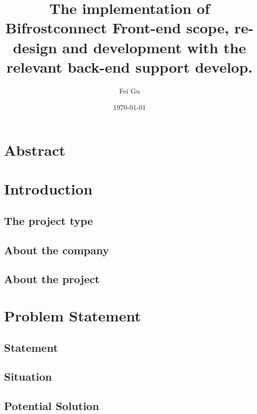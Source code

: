 \documentclass{article}
\title{The implementation of Bifrostconnect Front-end scope, re-design and
development with the relevant back-end support develop.}
\author{Fei Gu}
\date{\today}
\begin{document}
\maketitle
\section*{Abstract}
\pagebreak

\tableofcontents
\pagebreak

\section{Introduction}

    \subsection{The project type}
    

    \subsection{About the company}
    

    \subsection{About the project}
    

\pagebreak

\section{Problem Statement}
    
        \subsection{Statement}
        
    
        \subsection{Situation}
        
    
        \subsection{Potential Solution}
        
\end{document}
